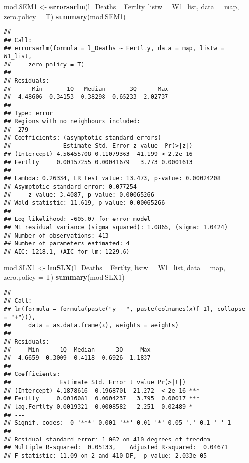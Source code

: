 \documentclass[]{article}
\newenvironment{Shaded}{\begin{snugshade}}{\end{snugshade}}
\newcommand{\KeywordTok}[1]{\textcolor[rgb]{0.13,0.29,0.53}{\textbf{#1}}}
\newcommand{\DataTypeTok}[1]{\textcolor[rgb]{0.13,0.29,0.53}{#1}}
\newcommand{\StringTok}[1]{\textcolor[rgb]{0.31,0.60,0.02}{#1}}
\newcommand{\OperatorTok}[1]{\textcolor[rgb]{0.81,0.36,0.00}{\textbf{#1}}}
\newcommand{\NormalTok}[1]{#1}
\begin{document}
\begin{Shaded}
\begin{Highlighting}[]
\NormalTok{mod.SEM1 <-}\StringTok{ }\KeywordTok{errorsarlm}\NormalTok{(l_Deaths }\OperatorTok{~}\StringTok{ }\NormalTok{Fertlty, }\DataTypeTok{listw =}\NormalTok{ W1_list, }\DataTypeTok{data =}\NormalTok{ map, }\DataTypeTok{zero.policy =}\NormalTok{ T)}
\KeywordTok{summary}\NormalTok{(mod.SEM1)}
\end{Highlighting}
\end{Shaded}

\begin{verbatim}
## 
## Call:
## errorsarlm(formula = l_Deaths ~ Fertlty, data = map, listw = W1_list, 
##     zero.policy = T)
## 
## Residuals:
##      Min       1Q   Median       3Q      Max 
## -4.48606 -0.34153  0.38298  0.65233  2.02737 
## 
## Type: error 
## Regions with no neighbours included:
##  279 
## Coefficients: (asymptotic standard errors) 
##               Estimate Std. Error z value  Pr(>|z|)
## (Intercept) 4.56455708 0.11079363  41.199 < 2.2e-16
## Fertlty     0.00157255 0.00041679   3.773 0.0001613
## 
## Lambda: 0.26334, LR test value: 13.473, p-value: 0.00024208
## Asymptotic standard error: 0.077254
##     z-value: 3.4087, p-value: 0.00065266
## Wald statistic: 11.619, p-value: 0.00065266
## 
## Log likelihood: -605.07 for error model
## ML residual variance (sigma squared): 1.0865, (sigma: 1.0424)
## Number of observations: 413 
## Number of parameters estimated: 4 
## AIC: 1218.1, (AIC for lm: 1229.6)
\end{verbatim}

\begin{Shaded}
\begin{Highlighting}[]
\NormalTok{mod.SLX1 <-}\StringTok{ }\KeywordTok{lmSLX}\NormalTok{(l_Deaths }\OperatorTok{~}\StringTok{ }\NormalTok{Fertlty, }\DataTypeTok{listw =}\NormalTok{ W1_list, }\DataTypeTok{data =}\NormalTok{ map, }\DataTypeTok{zero.policy =}\NormalTok{ T)}
\KeywordTok{summary}\NormalTok{(mod.SLX1)}
\end{Highlighting}
\end{Shaded}

\begin{verbatim}
## 
## Call:
## lm(formula = formula(paste("y ~ ", paste(colnames(x)[-1], collapse = "+"))), 
##     data = as.data.frame(x), weights = weights)
## 
## Residuals:
##     Min      1Q  Median      3Q     Max 
## -4.6659 -0.3009  0.4118  0.6926  1.1837 
## 
## Coefficients:
##              Estimate Std. Error t value Pr(>|t|)    
## (Intercept) 4.1878616  0.1968701  21.272  < 2e-16 ***
## Fertlty     0.0016081  0.0004237   3.795  0.00017 ***
## lag.Fertlty 0.0019321  0.0008582   2.251  0.02489 *  
## ---
## Signif. codes:  0 '***' 0.001 '**' 0.01 '*' 0.05 '.' 0.1 ' ' 1
## 
## Residual standard error: 1.062 on 410 degrees of freedom
## Multiple R-squared:  0.05133,    Adjusted R-squared:  0.04671 
## F-statistic: 11.09 on 2 and 410 DF,  p-value: 2.033e-05
\end{verbatim}
\end{document}

